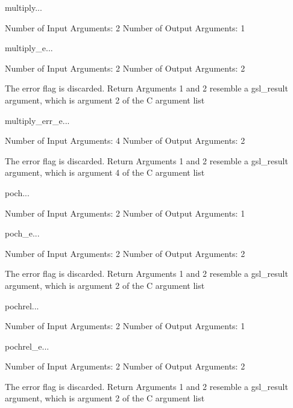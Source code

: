 \begin{funcdesc}{multiply}{...}

    Number of Input  Arguments:  2
    Number of Output Arguments:  1
\end{funcdesc}

\begin{funcdesc}{multiply_e}{...}

    Number of Input  Arguments:  2
    Number of Output Arguments:  2

The error flag is discarded.
Return Arguments 1 and 2 resemble a gsl_result argument,
	which is  argument 2 of the C argument list

\end{funcdesc}

\begin{funcdesc}{multiply_err_e}{...}

    Number of Input  Arguments:  4
    Number of Output Arguments:  2

The error flag is discarded.
Return Arguments 1 and 2 resemble a gsl_result argument,
	which is  argument 4 of the C argument list

\end{funcdesc}

\begin{funcdesc}{poch}{...}

    Number of Input  Arguments:  2
    Number of Output Arguments:  1
\end{funcdesc}

\begin{funcdesc}{poch_e}{...}

    Number of Input  Arguments:  2
    Number of Output Arguments:  2

The error flag is discarded.
Return Arguments 1 and 2 resemble a gsl_result argument,
	which is  argument 2 of the C argument list

\end{funcdesc}

\begin{funcdesc}{pochrel}{...}

    Number of Input  Arguments:  2
    Number of Output Arguments:  1
\end{funcdesc}

\begin{funcdesc}{pochrel_e}{...}

    Number of Input  Arguments:  2
    Number of Output Arguments:  2

The error flag is discarded.
Return Arguments 1 and 2 resemble a gsl_result argument,
	which is  argument 2 of the C argument list

\end{funcdesc}

